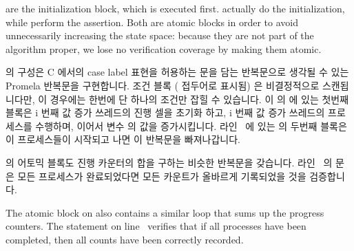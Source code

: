 \begin{fcvref}
\begin{fcvref}
 are the initialization block,
which is executed first.
 actually do the initialization,
while 
perform the assertion.
Both are atomic blocks in order to avoid unnecessarily increasing
the state space: because they are not part of the algorithm proper,
we lose no verification coverage by making them atomic.

\fi

 의  구성은 C 에서의 case label 표현을
허용하는  문을 담는  반복문으로 생각될 수 있는 Promela
반복문을 구현합니다.
조건 블록 (\co{::} 접두어로 표시됨) 은 비결정적으로 스캔됩니다만, 이 경우에는
한번에 단 하나의 조건만 잡힐 수 있습니다.
이  의
 에 있는 첫번째 블록은 i 번째 값 증가 쓰레드의
진행 셀을 초기화 하고, i 번째 값 증가 쓰레드의 프로세스를 수행하며, 이어서 변수
 의 값을 증가시킵니다.
라인~ 에 있는  의 두번째 블록은 이 프로세스들이
시작되고 나면 이 반복문을 빠져나갑니다.

\iffalse

The \co{do-od} construct on \clnrefrange{dood1:b}{dood1:e}
implements a Promela loop,
which can be thought of as a C \co{for (;;)} loop containing a
\co{switch} statement that allows expressions in case labels.
The condition blocks (prefixed by \co{::})
are scanned non-deterministically,
though in this case only one of the conditions can possibly hold at a given
time.
The first block of the \co{do-od} from
\clnrefrange{block1:b}{block1:e}
initializes the i-th
incrementer's progress cell, runs the i-th incrementer's process, and
then increments the variable \co{i}.
The second block of the \co{do-od} on
line~\lnref{block2} exits the loop once
these processes have been started.

\fi

 의 어토믹 블록도 진행 카운터의 합을 구하는
비슷한  반복문을 갖습니다.
라인~ 의  문은 모든 프로세스가 완료되었다면 모든
카운트가 올바르게 기록되었을 것을 검증합니다.
\end{fcvref}

\iffalse

The atomic block on  also contains
a similar 
loop that sums up the progress counters.
The  statement on line~ verifies that
if all processes
have been completed, then all counts have been correctly recorded.
\end{fcvref}

